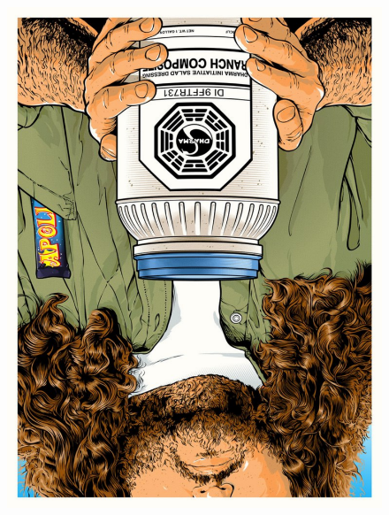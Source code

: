 \documentclass[12pt, a4paper]{article}
\begin{document}
\begin{figure}
\begin{minipage}[h!]{0.3\linewidth}
\includegraphics[width=1\textwidth, height = 0.32\textheight, angle=180]{pop10}
\end{minipage}
\hfil
\begin{minipage}[h!]{0.3\linewidth}

\end{minipage}
\end{figure}
\end{document}

